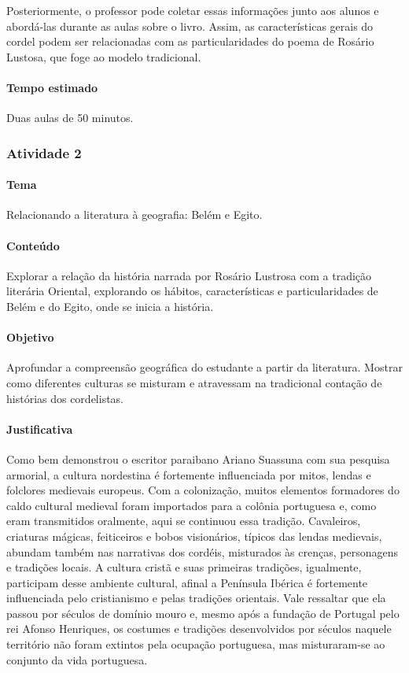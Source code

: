 \documentclass[11pt]{extarticle}
\begin{document}
Posteriormente, o professor pode coletar essas informações junto aos alunos e abordá-las durante as aulas sobre o livro. Assim, as características gerais do cordel podem ser relacionadas com as particularidades do poema de Rosário Lustosa, que foge ao modelo tradicional.


\paragraph{Tempo estimado} Duas aulas de 50 minutos.


\subsubsection{Atividade 2}


\paragraph{Tema} Relacionando a literatura à geografia: Belém e Egito.

\paragraph{Conteúdo} Explorar a relação da história narrada por Rosário Lustrosa com a tradição literária Oriental, explorando os hábitos, características e particularidades de Belém e do Egito, onde se inicia a história.

\paragraph{Objetivo} Aprofundar a compreensão geográfica do estudante a partir da literatura. Mostrar como diferentes culturas se misturam e atravessam na tradicional contação de histórias dos cordelistas. 

\paragraph{Justificativa} Como bem demonstrou o escritor paraibano Ariano Suassuna com sua pesquisa armorial, a cultura nordestina é fortemente influenciada por mitos, lendas e folclores medievais europeus. Com a colonização, muitos elementos formadores do caldo cultural medieval foram importados para a colônia portuguesa e, como eram transmitidos oralmente, aqui se continuou essa tradição. Cavaleiros, criaturas mágicas, feiticeiros e bobos visionários, típicos das lendas medievais, abundam também nas narrativas dos cordéis, misturados às crenças, personagens e tradições locais. A cultura cristã e suas primeiras tradições, igualmente, participam desse ambiente cultural, afinal a Península Ibérica é fortemente influenciada pelo cristianismo e pelas tradições orientais. Vale ressaltar que ela passou por séculos de domínio mouro e, mesmo após a fundação de Portugal pelo rei Afonso Henriques, os costumes e tradições desenvolvidos por séculos naquele território não foram extintos pela ocupação portuguesa, mas misturaram-se ao conjunto da vida portuguesa.
\end{document}
